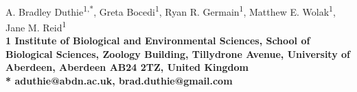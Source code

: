 \documentclass[10pt,letterpaper]{article}
\begin{document}
\vspace*{0.35in}

\begin{flushleft}
{\LARGE
\textbf{}
}
\newline
\\
A. Bradley Duthie\textsuperscript{1,*},
Greta Bocedi\textsuperscript{1},
Ryan R. Germain\textsuperscript{1},
Matthew E. Wolak\textsuperscript{1},
Jane M. Reid\textsuperscript{1}
\\
\bigskip
\bf{1} Institute of Biological and Environmental Sciences, School of Biological Sciences, Zoology Building, Tillydrone Avenue, University of Aberdeen, Aberdeen AB24 2TZ, United Kingdom
\\
\bigskip
*  aduthie@abdn.ac.uk, brad.duthie@gmail.com

\end{flushleft}
\end{document}
